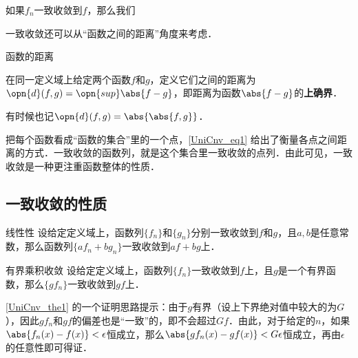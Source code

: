 如果$f_n$一致收敛到$f$，那么我们

一致收敛还可以从“函数之间的距离”角度来考虑．

\begin{definition}{函数的距离}\label{UniCnv_def1}

在同一定义域上给定两个函数$f$和$g$，定义它们之间的距离为$\opn{d}(f, g)=\opn{sup}\abs{f-g}$，即距离为函数$\abs{f-g}$的\textbf{上确界}．

有时候也记$\opn{d}(f, g)=\abs{\abs{f, g}}$．

\end{definition}

把每个函数看成“函数的集合”里的一个点，\autoref{UniCnv_eq1} 给出了衡量各点之间距离的方式．一致收敛的函数列，就是这个集合里一致收敛的点列．由此可见，一致收敛是一种更注重函数整体的性质．


\subsection{一致收敛的性质}

\begin{theorem}{线性性}
设给定定义域上，函数列$\{f_n\}$和$\{g_n\}$分别一致收敛到$f$和$g$，且$a, b$是任意常数，那么函数列$\{af_n+bg_n\}$一致收敛到$af+bg$上．
\end{theorem}

\begin{theorem}{有界乘积收敛}\label{UniCnv_the1}
设给定定义域上，函数列$\{f_n\}$一致收敛到$f$上，且$g$是一个有界函数，那么$\{gf_n\}$一致收敛到$gf$上．
\end{theorem}

\autoref{UniCnv_the1} 的一个证明思路提示：由于$g$有界（设上下界绝对值中较大的为$G$），因此$gf_n$和$gf$的偏差也是“一致”的，即不会超过$Gf$．由此，对于给定的$n$，如果$\abs{f_n(x)-f(x)}<\epsilon$恒成立，那么$\abs{gf_n(x)-gf(x)}<G\epsilon$恒成立，再由$\epsilon$的任意性即可得证．



















